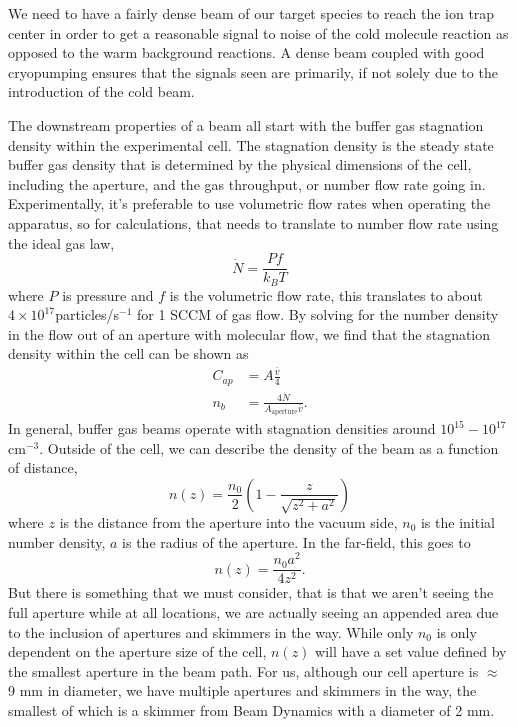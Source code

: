 We need to have a fairly dense beam of our target species to reach the ion trap center in order to get a reasonable signal to noise of the cold molecule reaction as opposed to the warm background reactions. A dense beam coupled with good cryopumping ensures that the signals seen are primarily, if not solely due to the introduction of the cold beam.

The downstream properties of a beam all start with the buffer gas stagnation density within the experimental cell. The stagnation density is the steady state buffer gas density that is determined by the physical dimensions of the cell, including the aperture, and the gas throughput, or number flow rate going in. Experimentally, it's preferable to use volumetric flow rates when operating the apparatus, so for calculations, that needs to translate to number flow rate using the ideal gas law,
\begin{equation*}
	\dot{N} = \frac{P f}{k_B T}
\end{equation*}
where $P$ is pressure and $f$ is the volumetric flow rate, this translates to about $4\times10^{17}$particles/s$^{-1}$ for 1 SCCM of gas flow. By solving for the number density in the flow out of an aperture with molecular flow, we find that the stagnation density within the cell can be shown as
\begin{align}
	C_{ap} & = A \frac{\bar{v}}{4} \nonumber \\
	n_{b} & = \frac{4 \dot{N}}{A_{\mathrm{aperture}} \bar{v}} \label{eq: n_b}.
\end{align}
In general, buffer gas beams operate with stagnation densities around $10^{15}-10^{17}$cm$^{-3}$. Outside of the cell, we can describe the density of the beam as a function of distance,\cite{Pauly}
\begin{equation}
	n(z)=\frac{n_0}{2}\left(1-\frac{z}{\sqrt{z^2+a^2}}\right)
	\label{eq: n(z)}
\end{equation}
where $z$ is the distance from the aperture into the vacuum side, $n_0$ is the initial number density, $a$ is the radius of the aperture. In the far-field, this goes to
\begin{equation*}
	n(z)=\frac{n_0 a^2}{4 z^2}.
\end{equation*}
But there is something that we must consider, that is that we aren't seeing the full aperture while at all locations, we are actually seeing an appended area due to the inclusion of apertures and skimmers in the way.\cite{Pauly} While only $n_0$ is only dependent on the aperture size of the cell, $n(z)$ will have a set value defined by the smallest aperture in the beam path. For us, although our cell aperture is $\approx$ 9 mm in diameter, we have multiple apertures and skimmers in the way, the smallest of which is a skimmer from Beam Dynamics with a diameter of 2 mm.

